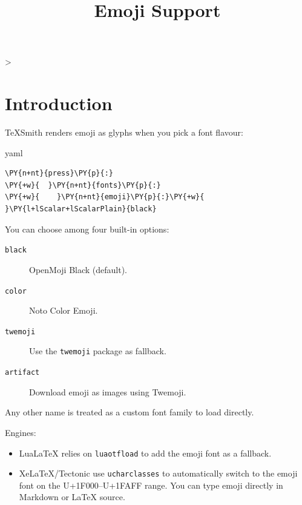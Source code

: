 \documentclass[a4paper,twoside]{article}
\title{Emoji Support}
\author{}\date{}
\makeatletter
\newcommand\tsreplayfn{%
  \ts@loopcnt\z@
  \loop
    \advance\ts@loopcnt\@ne
    \ifnum\ts@loopcnt>\ts@affilcnt\else
      \xdef\@thefnmark{\csname ts@affilM\the\ts@loopcnt\endcsname}%
      \@footnotetext{\csname ts@affilT\the\ts@loopcnt\endcsname}%
  \repeat
}
\makeatother
\begin{document}
\twocolumn[{%
\maketitle
}]
\tsreplayfn

\thispagestyle{plain}
\section{Introduction}\label{introduction}

TeXSmith renders emoji as glyphs when you pick a font flavour:

\begin{code}{yaml}{}{}
\begin{Verbatim}[commandchars=\\\{\},breaklines, breakanywhere, commandchars=\\\{\}]
\PY{n+nt}{press}\PY{p}{:}
\PY{+w}{  }\PY{n+nt}{fonts}\PY{p}{:}
\PY{+w}{    }\PY{n+nt}{emoji}\PY{p}{:}\PY{+w}{ }\PY{l+lScalar+lScalarPlain}{black}
\end{Verbatim}
\end{code}
You can choose among four built-in options:

\begin{description}
\item[{ \texttt{black} }] OpenMoji Black (default).
\item[{ \texttt{color} }] Noto Color Emoji.
\item[{ \texttt{twemoji} }] Use the \texttt{twemoji} package as fallback.
\item[{ \texttt{artifact} }] Download emoji as images using Twemoji.

\end{description}
Any other name is treated as a custom font family to load directly.

Engines:

\begin{itemize}
\item{} LuaLaTeX relies on \texttt{luaotfload} to add the emoji font as a fallback.
\item{} XeLaTeX/Tectonic use \texttt{ucharclasses} to automatically switch to the emoji font on the U+1F000--U+1FAFF range.
You can type emoji directly in Markdown or LaTeX source.

\end{itemize}
\newpage
\end{document}

